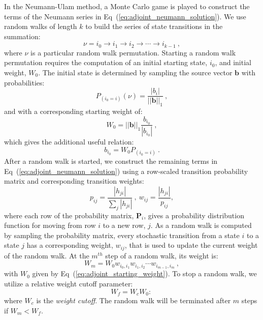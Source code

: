 \documentclass[preprint,11pt]{elsarticle}
\newcommand{\ve}[1]{\ensuremath{\mathbf{#1}}}
\begin{document}
In the Neumann-Ulam method, a Monte Carlo game is played to construct the
terms of the Neumann series in Eq~(\ref{eq:adjoint_neumann_solution}). We use
random walks of length $k$ to build the series of state transitions in the
summation:
\begin{equation}
  \nu = i_0 \rightarrow i_1 \rightarrow i_2 \rightarrow \cdots \rightarrow
  i_{k-1}\:,
  \label{eq:permutation}
\end{equation}
where $\nu$ is a particular random walk permutation. Starting a random walk
permutation requires the computation of an initial starting state, $i_0$, and
initial weight, $W_0$. The initial state is determined by sampling the source
vector $\ve{b}$ with probabilities:
\begin{equation}
  P_{(i_0=i)}(\nu) = \frac{|b_i|}{||\ve{b}||_1}\:,
  \label{eq:adjoint_source_probability}
\end{equation}
and with a corresponding starting weight of:
\begin{equation}
  W_0 = ||\ve{b}||_1 \frac{b_{i_0}}{|b_{i_0}|}\:,
  \label{eq:adjoint_starting_weight}
\end{equation}
which gives the additional useful relation:
\begin{equation}
  b_{i_0} = W_0 P_{(i_0=i)}\:.
  \label{eq:adjoint_source_definition}
\end{equation}
After a random walk is started, we construct the remaining terms in
Eq~(\ref{eq:adjoint_neumann_solution}) using a row-scaled transition probability
matrix and corresponding transition weights:
\begin{equation}
  p_{ij} = \frac{|h_{ji}|}{\sum_j |h_{ji}|}\:,\ w_{ij} =
  \frac{|h_{ji}|}{p_{ij}},
  \label{eq:adjoint_probability}
\end{equation}
where each row of the probability matrix, $\ve{P}_i$, gives a probability
distribution function for moving from row $i$ to a new row, $j$. As a random
walk is computed by sampling the probability matrix, every stochastic
transition from a state $i$ to a state $j$ has a corresponding weight,
$w_{ij}$, that is used to update the current weight of the random walk. At the
$m^{th}$ step of a random walk, its weight is:
\begin{equation}
  W_{m} = W_0 w_{i_0,i_1} w_{i_1,i_2} \cdots w_{i_{m-1},i_m}\:,
  \label{eq:direct_permutation_weight}
\end{equation}
with $W_0$ given by Eq~(\ref{eq:adjoint_starting_weight}). To stop a random
walk, we utilize a relative weight cutoff parameter:
\begin{equation}
  W_f = W_c W_0:\,
  \label{eq:relative_weight_cutoff}
\end{equation}
where $W_c$ is the \textit{weight cutoff}. The random walk will be terminated
after $m$ steps if $W_m < W_f$.
\end{document}
